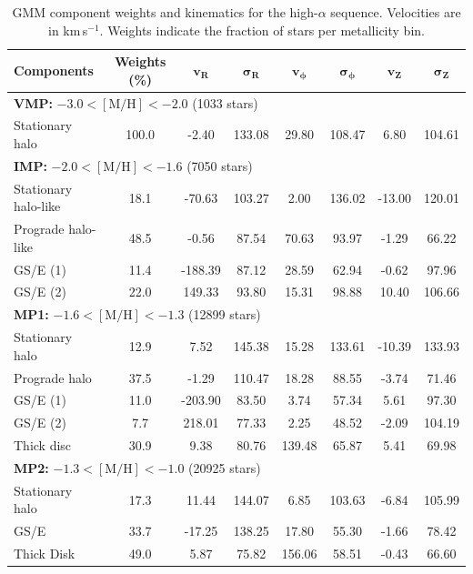 \documentclass[a4paper,12pt]{article}
\begin{document}
\begin{table}[H]
\centering
\begin{tabular}{lccccccc}
\hline
\textbf{Components} & \textbf{Weights (\%)} & $\mathbf{v_R}$ & $\boldsymbol{\sigma_R}$ & $\mathbf{v_\phi}$ & $\boldsymbol{\sigma_\phi}$ & $\mathbf{v_Z}$ & $\boldsymbol{\sigma_Z}$ \\
\hline
\multicolumn{8}{l}{\textbf{VMP:} $-3.0 < \mathrm{[M/H]} < -2.0$ (1033 stars)} \\
Stationary halo     & 100.0 &  -2.40 & 133.08 &  29.80 & 108.47 &  6.80 & 104.61 \\
\hline
\multicolumn{8}{l}{\textbf{IMP:} $-2.0 < \mathrm{[M/H]} < -1.6$ (7050 stars)} \\
Stationary halo-like &  18.1 & -70.63 & 103.27 &   2.00 & 136.02 & -13.00 & 120.01 \\
Prograde halo-like   &  48.5 &  -0.56 &  87.54 &  70.63 &  93.97 &  -1.29 &  66.22 \\
GS/E (1)            &  11.4 &-188.39 &  87.12 &  28.59 &  62.94 &  -0.62 &  97.96 \\
GS/E (2)            &  22.0 & 149.33 &  93.80 &  15.31 &  98.88 &  10.40 & 106.66 \\
\hline
\multicolumn{8}{l}{\textbf{MP1:} $-1.6 < \mathrm{[M/H]} < -1.3$ (12899 stars)} \\
Stationary halo     &  12.9 &   7.52 & 145.38 &  15.28 & 133.61 & -10.39 & 133.93 \\
Prograde halo       &  37.5 &  -1.29 & 110.47 &  18.28 &  88.55 &  -3.74 &  71.46 \\
GS/E (1)            &  11.0 &-203.90 &  83.50 &   3.74 &  57.34 &   5.61 &  97.30 \\
GS/E (2)            &   7.7 & 218.01 &  77.33 &   2.25 &  48.52 &  -2.09 & 104.19 \\
Thick disc          &  30.9 &   9.38 &  80.76 & 139.48 &  65.87 &   5.41 &  69.98 \\
\hline
\multicolumn{8}{l}{\textbf{MP2:} $-1.3 < \mathrm{[M/H]} < -1.0$ (20925 stars)} \\
Stationary halo     &  17.3 &  11.44 & 144.07 &   6.85 & 103.63 &  -6.84 & 105.99 \\
GS/E                &  33.7 & -17.25 & 138.25 &  17.80 &  55.30 &  -1.66 &  78.42 \\
Thick Disk          &  49.0 &   5.87 &  75.82 & 156.06 &  58.51 &  -0.43 &  66.60 \\
\hline
\end{tabular}
\caption{GMM component weights and kinematics for the high-$\alpha$ sequence.  
Velocities are in km\,s$^{-1}$. Weights indicate the fraction of stars per metallicity bin.}
\label{tab:gmm_higha_stats}
\end{table}
\end{document}
